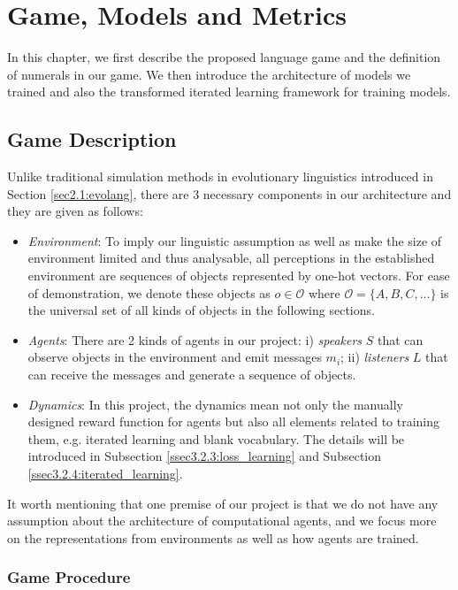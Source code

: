 \chapter{Game, Models and Metrics}
\label{ch3:game_model}

In this chapter, we first describe the proposed language game and the definition of numerals in our game. We then introduce the architecture of models we trained and also the transformed iterated learning framework for training models.

\section{Game Description}
\label{sec3.1:game_description}

Unlike traditional simulation methods in evolutionary linguistics introduced in Section \ref{sec2.1:evolang}, there are 3 necessary components in our architecture and they are given as follows:

\begin{itemize}
  \item \textit{Environment}: To imply our linguistic assumption as well as make the size of environment limited and thus analysable, all perceptions in the established environment are sequences of objects represented by one-hot vectors. For ease of demonstration, we denote these objects as $o \in \mathcal{O}$ where $\mathcal{O} = \{A, B, C, \dots\}$ is the universal set of all kinds of objects in the following sections.
  \item \textit{Agents}: There are 2 kinds of agents in our project: i) \textit{speakers} $S$ that can observe objects in the environment and emit messages $m_i$; ii) \textit{listeners} $L$ that can receive the messages and generate a sequence of objects.
  \item \textit{Dynamics}: In this project, the dynamics mean not only the manually designed reward function for agents but also all elements related to training them, e.g. iterated learning and blank vocabulary. The details will be introduced in Subsection \ref{ssec3.2.3:loss_learning} and Subsection \ref{ssec3.2.4:iterated_learning}. 
\end{itemize}

It worth mentioning that one premise of our project is that we do not have any assumption about the architecture of computational agents, and we focus more on the representations from environments as well as how agents are trained.

\subsection{Game Procedure}
\label{ssec3.1.1:game_procedure}

